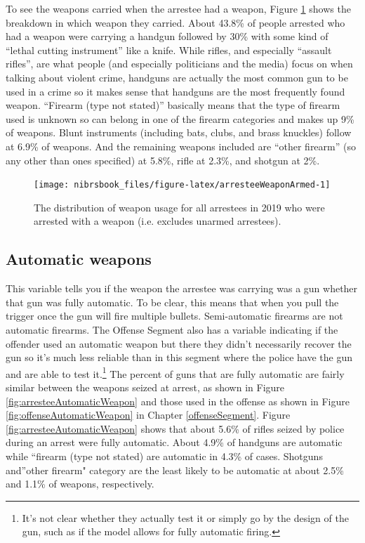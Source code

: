 \documentclass[
  12pt,
  openany]{book}
\begin{document}
To see the weapons carried when the arrestee had a weapon, Figure \ref{fig:arresteeWeaponArmed} shows the breakdown in which weapon they carried. About 43.8\% of people arrested who had a weapon were carrying a handgun followed by 30\% with some kind of ``lethal cutting instrument'' like a knife. While rifles, and especially ``assault rifles'', are what people (and especially politicians and the media) focus on when talking about violent crime, handguns are actually the most common gun to be used in a crime so it makes sense that handguns are the most frequently found weapon. ``Firearm (type not stated)'' basically means that the type of firearm used is unknown so can belong in one of the firearm categories and makes up 9\% of weapons. Blunt instruments (including bats, clubs, and brass knuckles) follow at 6.9\% of weapons. And the remaining weapons included are ``other firearm'' (so any other than ones specified) at 5.8\%, rifle at 2.3\%, and shotgun at 2\%.

\begin{figure}

{\centering \texttt{[image: nibrsbook\_files/figure-latex/arresteeWeaponArmed-1]} 

}

\caption{The distribution of weapon usage for all arrestees in 2019 who were arrested with a weapon (i.e. excludes unarmed arrestees).}\label{fig:arresteeWeaponArmed}
\end{figure}

\hypertarget{automatic-weapons-1}{%
\subsection{Automatic weapons}\label{automatic-weapons-1}}

This variable tells you if the weapon the arrestee was carrying was a gun whether that gun was fully automatic. To be clear, this means that when you pull the trigger once the gun will fire multiple bullets. Semi-automatic firearms are not automatic firearms. The Offense Segment also has a variable indicating if the offender used an automatic weapon but there they didn't necessarily recover the gun so it's much less reliable than in this segment where the police have the gun and are able to test it.\footnote{It's not clear whether they actually test it or simply go by the design of the gun, such as if the model allows for fully automatic firing.} The percent of guns that are fully automatic are fairly similar between the weapons seized at arrest, as shown in Figure \ref{fig:arresteeAutomaticWeapon} and those used in the offense as shown in Figure \ref{fig:offenseAutomaticWeapon} in Chapter \ref{offenseSegment}. Figure \ref{fig:arresteeAutomaticWeapon} shows that about 5.6\% of rifles seized by police during an arrest were fully automatic. About 4.9\% of handguns are automatic while ``firearm (type not stated) are automatic in 4.3\% of cases. Shotguns and''other firearm" category are the least likely to be automatic at about 2.5\% and 1.1\% of weapons, respectively.
\end{document}
